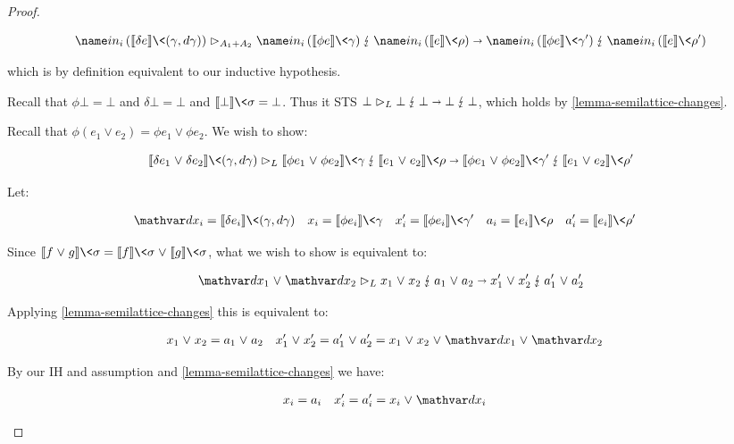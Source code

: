 \begin{proof}
\begin{description}[topsep=\baselineskip,itemsep=\baselineskip]
    \[
    \weirdat{A_1 + A_2}
    {\inj i (\den{\delta e}\<(\gamma,\dgamma))}
    {\inj i (\den{\phi e}\<\gamma)}
    {\inj i (\den{e}\<\rho)}
    {\inj i (\den{\phi e}\<\gamma')}
    {\inj i (\den{e}\<\rho')}
    \]
    
    \noindent
    which is by definition equivalent to our inductive hypothesis.

  \item[Case $\infer{ }{\J \bot \G {L}}$.]
    Recall that $\phi \bot = \bot$ and $\delta \bot = \bot$ and $\den{\bot}\<\sigma = \bot$. Thus it STS ${\bot} \mathrel{\rhd}_{L} \bot \mathbin{\lightning} \bot \shortrightarrow \bot \mathbin{\lightning} \bot$, which holds by \cref{lemma-semilattice-changes}.

  \item[Case $\infer{(\J{e_i} \G {L})_i}{\J{e_1 \vee e_2} \G {L}}$.]
    Recall that $\phi(e_1 \vee e_2) = \phi e_1 \vee \phi e_2$. We wish to show:

    \[
    \weirdat{L}
    {\den{\delta e_1 \vee \delta e_2} \<(\gamma,\dgamma)}
    {\den{\phi e_1 \vee \phi e_2}\<\gamma}
    {\den{e_1 \vee e_2}\<\rho}
    {\den{\phi e_1 \vee \phi e_2}\<\gamma'}
    {\den{e_1 \vee e_2}\<\rho'}
    \]

    Let:

    \begin{align*}
      \dx_i &= \den{\delta e_i}\<(\gamma,\dgamma)
      &
      x_i &= \den{\phi e_i}\<\gamma
      &
      x'_i &= \den{\phi e_i}\<\gamma'
      &
      a_i &= \den{e_i}\<\rho
      &
      a'_i &= \den{e_i}\<\rho'
    \end{align*}

    Since $\den{f \vee g}\<\sigma = \den{f}\<\sigma \vee \den{g}\<\sigma$, what we wish to show is equivalent to:

    \[
    \weirdat{L} {\dx_1 \vee \dx_2}
    {x_1 \vee x_2} {a_1 \vee a_2}
    {x'_1 \vee x'_2} {a'_1 \vee a'_2}
    \]

    \noindent
    Applying \cref{lemma-semilattice-changes} this is equivalent to:

    \begin{align*}
      x_1 \vee x_2 &= a_1 \vee a_2
      &
      x'_1 \vee x'_2 &= a'_1 \vee a'_2 = x_1 \vee x_2 \vee \dx_1 \vee \dx_2
    \end{align*}
    
    By our IH and assumption and \cref{lemma-semilattice-changes} we have:

    \begin{align*}
      x_i &= a_i
      &
      x'_i &= a'_i = x_i \vee \dx_i
    \end{align*}


\end{description}
\end{proof}
